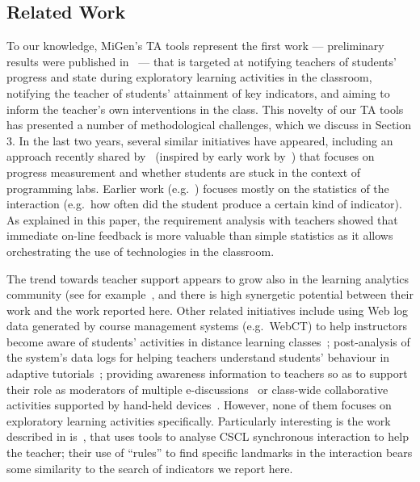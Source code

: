\subsection{Related Work}
\label{sec:related}

To our knowledge, MiGen's TA tools represent the first work ---
preliminary results were published in~\cite{TA-ECTEL} --- that is
targeted at notifying teachers of students’ progress and state during
exploratory learning activities in the classroom, notifying the
teacher of students’ attainment of key indicators, and aiming to
inform the teacher’s own interventions in the class. This novelty of
our TA tools has presented a number of methodological challenges,
which we discuss in Section 3. In the last two years, several similar
initiatives have appeared, including an approach
recently shared by~\cite{Gutierrez12} (inspired by early work
by~\cite{Yardi08}) that focuses on progress measurement and
whether students are stuck in the context of programming labs.
Earlier work (e.g.~\cite{Gueraud09}) focuses mostly on the statistics
 of the interaction (e.g.~how often did the student produce a certain
 kind of indicator). As explained in this paper, the requirement
 analysis with teachers showed that immediate on-line feedback
 is more valuable than simple statistics as it allows orchestrating
 the use of technologies in the classroom.

The trend towards teacher support appears to grow
also in the learning analytics community
(see for example~\cite{Crespo12,Zaldivar12,Pardo12}, and there is high
synergetic potential between their work and the work reported here.
Other related initiatives include 
using Web log data generated by course management systems
(e.g.~WebCT) to help instructors become aware of students’
activities in distance learning classes~\cite{Mazza07}; post-analysis of
the system's data logs for helping teachers understand students'
behaviour in adaptive tutorials~\cite{BenAnim08}; 
 providing
awareness information to teachers so as to support their role as 
moderators of multiple e-discussions~\cite{Wichmann09} or class-wide
collaborative activities supported by hand-held devices~\cite{CortezNussbaum2009}. 
However, none of them
focuses on exploratory learning activities specifically. 
Particularly interesting is the work described in 
is~\cite{Avouris08}, that uses tools to analyse CSCL 
synchronous interaction to help the teacher; their use of ``rules'' to
find specific landmarks in the interaction bears some
similarity to the search of indicators we report here. 



